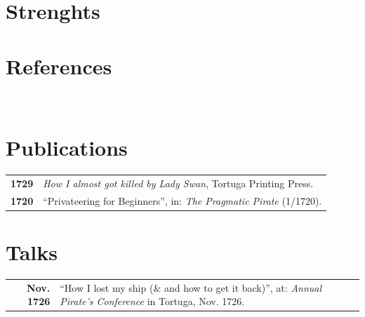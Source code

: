 \documentclass[grey]{hipstercv}
\begin{document}
\begin{paracol}{2}
\begin{minipage}[t]{0.3\textwidth}
\section*{Strenghts}
\section*{References}
 \\

\end{minipage}\hfill
\begin{minipage}[t]{0.3\textwidth}
\section*{Publications}
\begin{tabular}{>{\footnotesize\bfseries}r >{\footnotesize}p{}}
    1729 & \emph{How I almost got killed by Lady Swan}, Tortuga Printing Press. \\
    1720 & ``Privateering for Beginners'', in: \emph{The Pragmatic Pirate} (1/1720).
\end{tabular}
\section*{Talks}
\begin{tabular}{>{\footnotesize\bfseries}r >{\footnotesize}p{}}
    Nov. 1726 & ``How I lost my ship (\& and how to get it back)'', at: \emph{Annual Pirate's Conference} in Tortuga, Nov. 1726.
\end{tabular}
\end{minipage}


\end{paracol}
\end{document}
